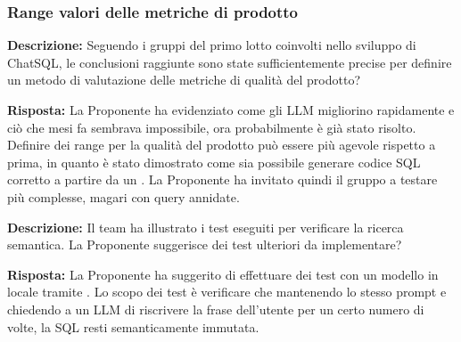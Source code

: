 \subsubsection{Range valori delle metriche di prodotto}

\par \textbf{Descrizione:} Seguendo i gruppi del primo lotto coinvolti nello sviluppo di ChatSQL, le conclusioni raggiunte sono state sufficientemente precise per definire un metodo di valutazione delle metriche di qualità del prodotto?
\par \textbf{Risposta:} La Proponente ha evidenziato come gli LLM migliorino rapidamente e ciò che mesi fa sembrava impossibile, ora probabilmente è già stato risolto. Definire dei range per la qualità del prodotto può essere più agevole rispetto a prima, in quanto è stato dimostrato come sia possibile generare codice SQL corretto a partire da un . La Proponente ha invitato quindi il gruppo a testare  più complesse, magari con query annidate.

\par \textbf{Descrizione:} Il team ha illustrato i test eseguiti per verificare la ricerca semantica. La Proponente suggerisce dei test ulteriori da implementare?
\par \textbf{Risposta:} La Proponente ha suggerito di effettuare dei test con un modello in locale tramite . Lo scopo dei test è verificare che mantenendo lo stesso prompt e chiedendo a un LLM di riscrivere la frase dell'utente per un certo numero di volte, la  SQL resti semanticamente immutata.
